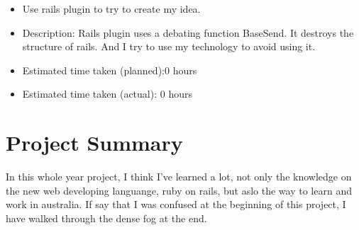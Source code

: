 \documentclass{article}
\begin{document}
\begin{itemize}
	\item Use rails plugin to try to create my idea.
	\item Description: Rails plugin uses a debating function BaseSend. It destroys the structure of rails. And I try to use my technology to avoid using it.
	\item Estimated time taken (planned):0 hours
	\item Estimated time taken (actual): 0 hours
\end{itemize}

\section*{Project Summary}
In this whole year project, I think I've learned a lot, not only the knowledge on the new web developing languange, ruby on rails, but aslo the way to learn and work in australia. If say that I was confused at the beginning of this project, I have walked through the dense fog at the end.
\end{document}
